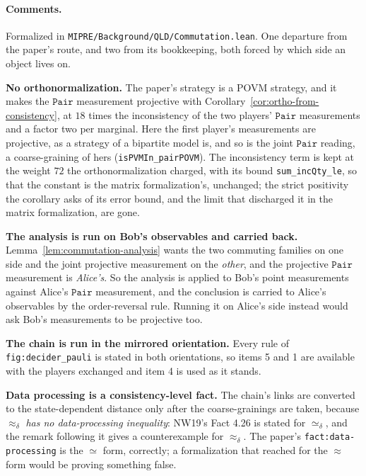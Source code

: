\paragraph{Comments.} Formalized in \texttt{MIPRE/Background/QLD/Commutation.lean}. One departure
from the paper's route, and two from its bookkeeping, both forced by which side an object lives on.

\textbf{No orthonormalization.} The paper's strategy is a POVM strategy, and it makes the
$\mathtt{Pair}$ measurement projective with Corollary~\ref{cor:ortho-from-consistency}, at $18$
times the inconsistency of the two players' $\mathtt{Pair}$ measurements and a factor two per
marginal. Here the first player's measurements are projective, as a strategy of a bipartite model
is, and so is the joint $\mathtt{Pair}$ reading, a coarse-graining of hers
(\texttt{isPVMIn\_pairPOVM}). The inconsistency term is kept at the weight $72$ the
orthonormalization charged, with its bound \texttt{sum\_incQty\_le}, so that the constant is the
matrix formalization's, unchanged; the strict positivity the corollary asks of its error bound, and
the limit that discharged it in the matrix formalization, are gone.

\textbf{The analysis is run on Bob's observables and carried back.}
Lemma~\ref{lem:commutation-analysis} wants the two commuting families on one side and the joint
projective measurement on the \emph{other}, and the projective $\mathtt{Pair}$ measurement is
\emph{Alice's}. So the analysis is applied to Bob's point measurements against Alice's
$\mathtt{Pair}$ measurement, and the conclusion is carried to Alice's observables by the
order-reversal rule. Running it on Alice's side instead would ask Bob's measurements to be
projective too.

\textbf{The chain is run in the mirrored orientation.} Every rule of \texttt{fig:decider\_pauli} is
stated in both orientations, so items 5 and 1 are available with the players exchanged and item 4 is
used as it stands.

\textbf{Data processing is a consistency-level fact.} The chain's links are converted to the
state-dependent distance only after the coarse-grainings are taken, because $\approx_\delta$
\emph{has no data-processing inequality}: NW19's Fact 4.26 is stated for $\simeq_\delta$, and the
remark following it gives a counterexample for $\approx_\delta$. The paper's
\texttt{fact:data-processing} is the $\simeq$ form, correctly; a formalization that reached for the
$\approx$ form would be proving something false.

